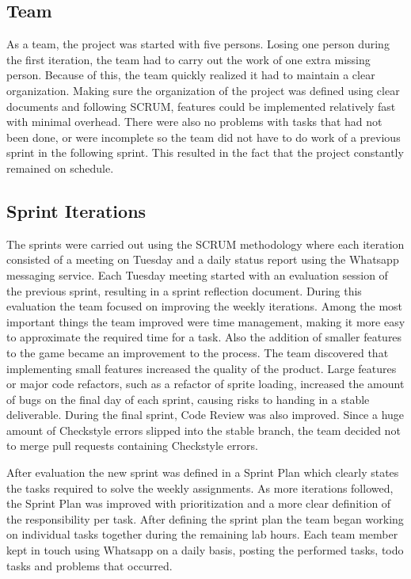 \documentclass[10pt]{article}
\begin{document}
\subsection*{Team}
As a team, the project was started with five persons. Losing one person during the first iteration, the team had to carry out the work of one extra missing person. Because of this, the team quickly realized it had to maintain a clear organization. Making sure the organization of the project was defined using clear documents and following SCRUM, features could be implemented relatively fast with minimal overhead. There were also no problems with tasks that had not been done, or were incomplete so the team did not have to do work of a previous sprint in the following sprint. This resulted in the fact that the project constantly remained on schedule.

\subsection*{Sprint Iterations}
The sprints were carried out using the SCRUM methodology where each iteration consisted of a meeting on Tuesday and a daily status report using the Whatsapp messaging service. Each Tuesday meeting started with an evaluation session of the previous sprint, resulting in a sprint reflection document. During this evaluation the team focused on improving the weekly iterations. Among the most important things the team improved were time management, making it more easy to approximate the required time for a task. Also the addition of smaller features to the game became an improvement to the process. The team discovered that implementing small features increased the quality of the product. Large features or major code refactors, such as a refactor of sprite loading, increased the amount of bugs on the final day of each sprint, causing risks to handing in a stable deliverable. During the final sprint, Code Review was also improved. Since a huge amount of Checkstyle errors slipped into the stable branch, the team decided not to merge pull requests containing Checkstyle errors.

After evaluation the new sprint was defined in a Sprint Plan which clearly states the tasks required to solve the weekly assignments. As more iterations followed, the Sprint Plan was improved with prioritization and a more clear definition of the responsibility per task. After defining the sprint plan the team began working on individual tasks together during the remaining lab hours. Each team member kept in touch using Whatsapp on a daily basis, posting the performed tasks, todo tasks and problems that occurred. 
\end{document}
